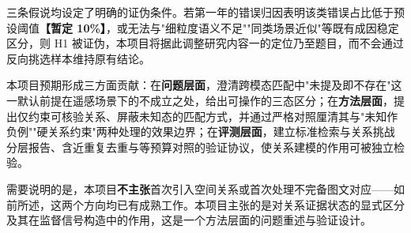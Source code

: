 三条假说均设定了明确的证伪条件。若第一年的错误归因表明该类错误占比低于预设阈值\textbf{【暂定 10\%】}，或无法与"细粒度语义不足""同类场景近似"等既有成因稳定区分，则 H1 被证伪，本项目将据此调整研究内容一的定位乃至题目，而不会通过反向挑选样本维持原有结论。


本项目预期形成三方面贡献：在\textbf{问题层面}，澄清跨模态匹配中"未提及即不存在"这一默认前提在遥感场景下的不成立之处，给出可操作的三态区分；在\textbf{方法层面}，提出仅约束可核验关系、屏蔽未知态的匹配方式，并通过严格对照厘清其与"未知作负例""硬关系约束"两种处理的效果边界；在\textbf{评测层面}，建立标准检索与关系挑战分层报告、含近重复去重与等预算对照的验证协议，使关系建模的作用可被独立检验。

需要说明的是，本项目\textbf{不主张}首次引入空间关系或首次处理不完备图文对应——如前所述，这两个方向均已有成熟工作。本项目主张的是对关系证据状态的显式区分及其在监督信号构造中的作用，这是一个方法层面的问题重述与验证设计。
